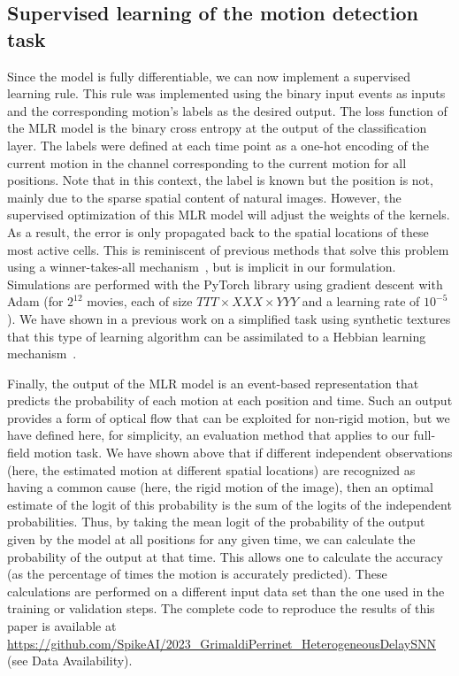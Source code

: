 \documentclass[default]{sn-jnl}%
\theoremstyle{thmstyleone}%
\theoremstyle{thmstyletwo}%
\theoremstyle{thmstylethree}%
\begin{document}
\subsection{Supervised learning of the motion detection task}
%
Since the model is fully differentiable, we can now implement a supervised learning rule. This rule was implemented using the binary input events as inputs and the corresponding motion's labels as the desired output. The loss function of the MLR model is the binary cross entropy at the output of the classification layer. The labels were defined at each time point as a one-hot encoding of the current motion in the channel corresponding to the current motion for all positions. Note that in this context, the label is known but the position is not, mainly due to the sparse spatial content of natural images. However, the supervised optimization of this MLR model will adjust the weights of the kernels. As a result, the error is only propagated back to the spatial locations of these most active cells. This is reminiscent of previous methods that solve this problem using a winner-takes-all mechanism~\citep{masquelier_unsupervised_2007}, but is implicit in our formulation. Simulations are performed with the PyTorch library using gradient descent with Adam (for $2^{12}$ movies, each of size $TTT \times XXX \times YYY$ and a learning rate of $10^{-5}$). We have shown in a previous work on a simplified task using synthetic textures that this type of learning algorithm can be assimilated to a Hebbian learning mechanism~\cite{grimaldi_robust_2022}.

Finally, the output of the MLR model is an event-based representation that predicts the probability of each motion at each position and time. Such an output provides a form of optical flow that can be exploited for non-rigid motion, but we have defined here, for simplicity, an evaluation method that applies to our full-field motion task. We have shown above that if different independent observations (here, the estimated motion at different spatial locations) are recognized as having a common cause (here, the rigid motion of the image), then an optimal estimate of the logit of this probability is the sum of the logits of the independent probabilities. Thus, by taking the mean logit of the probability of the output given by the model at all positions for any given time, we can calculate the probability of the output at that time. This allows one to calculate the accuracy (as the percentage of times the motion is accurately predicted). These calculations are performed on a different input data set than the one used in the training or validation steps. The complete code to reproduce the results of this paper is available at \url{https://github.com/SpikeAI/2023_GrimaldiPerrinet_HeterogeneousDelaySNN} (see Data Availability). %
%
\end{document}
